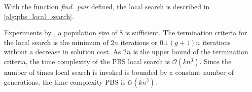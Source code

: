 

With the function \emph{find\_pair} defined, the local search is described in \cref{alg:pbs_local_search}.



Experiments by \citeauthor{pullan_memetic_2008}, a population size of 8 is sufficient. The termination criteria for the local search is the minimum of $2n$ iterations or $0.1(g + 1)n$ iterations without a decrease in solution cost. As $2n$ is the upper bound of the termination criteria, the time complexity of the PBS local search is $\mathcal{O}(kn^3)$. Since the number of times local search is invoked is bounded by a constant number of generations, the time complexity PBS is $\mathcal{O}(kn^3)$.